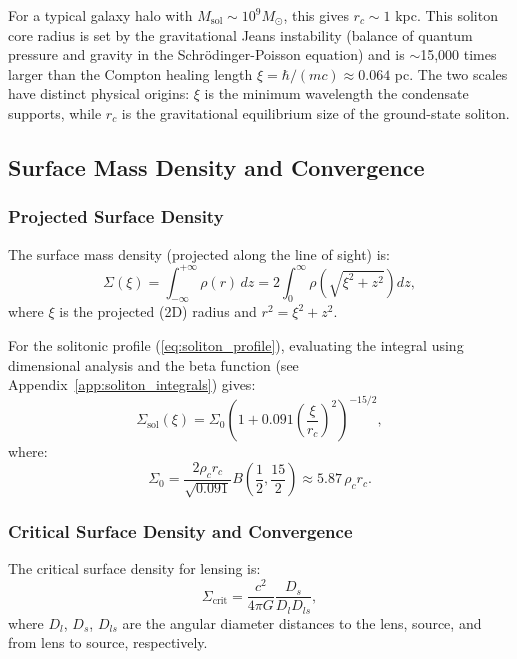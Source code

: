 \documentclass[11pt,a4paper]{article}
\newcommand{\Msun}{\ensuremath{M_\odot}}
\theoremstyle{definition}
\theoremstyle{remark}
\begin{document}
For a typical galaxy halo with $M_{\mathrm{sol}} \sim 10^9 \Msun$, this gives $r_c \sim 1$ kpc. This soliton core radius is set by the gravitational Jeans instability (balance of quantum pressure and gravity in the Schr\"odinger-Poisson equation) and is $\sim$15{,}000 times larger than the Compton healing length $\xi = \hbar/(mc) \approx 0.064$ pc. The two scales have distinct physical origins: $\xi$ is the minimum wavelength the condensate supports, while $r_c$ is the gravitational equilibrium size of the ground-state soliton.

\subsection{Surface Mass Density and Convergence}
\label{sec:convergence}

\subsubsection{Projected Surface Density}

The surface mass density (projected along the line of sight) is:
\begin{equation}
\Sigma(\xi) = \int_{-\infty}^{+\infty} \rho(r) \, dz = 2 \int_0^\infty \rho\left(\sqrt{\xi^2 + z^2}\right) dz,
\end{equation}
where $\xi$ is the projected (2D) radius and $r^2 = \xi^2 + z^2$.

For the solitonic profile (\ref{eq:soliton_profile}), evaluating the integral using dimensional analysis and the beta function (see Appendix~\ref{app:soliton_integrals}) gives:
\begin{equation}
\label{eq:surface_density_sol}
\Sigma_{\mathrm{sol}}(\xi) = \Sigma_0 \left(1 + 0.091 \left(\frac{\xi}{r_c}\right)^2\right)^{-15/2},
\end{equation}
where:
\begin{equation}
\Sigma_0 = \frac{2\rho_c r_c}{\sqrt{0.091}} B\left(\frac{1}{2}, \frac{15}{2}\right) \approx 5.87 \, \rho_c r_c.
\end{equation}

\subsubsection{Critical Surface Density and Convergence}

The critical surface density for lensing is:
\begin{equation}
\label{eq:sigma_crit}
\Sigma_{\mathrm{crit}} = \frac{c^2}{4\pi G} \frac{D_s}{D_l D_{ls}},
\end{equation}
where $D_l$, $D_s$, $D_{ls}$ are the angular diameter distances to the lens, source, and from lens to source, respectively.
\end{document}
